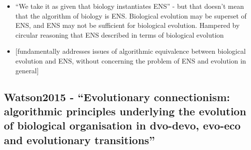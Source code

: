 \begin{itemize}
	\item
	
	``We take it as given that biology instantiates ENS'' - but that
	doesn't mean that the algorithm of biology is ENS. Biological
	evolution may be superset of ENS, and ENS may not be sufficient for
	biological evolution. Hampered by circular reasoning that ENS
	described in terms of biological evolution
	
	\item
	
	{[}fundamentally addresses issues of algorithmic equivalence between
	biological evolution and ENS, without concerning the problem of ENS
	and evolution in general{]}
	
\end{itemize}


\hypertarget{watson2015---evolutionary-connectionism-algorithmic-principles-underlying-the-evolution-of-biological-organisation-in-dvo-devo-evo-eco-and-evolutionary-transitions}{\subsection{Watson2015
		- ``Evolutionary connectionism: algorithmic principles underlying the
		evolution of biological organisation in dvo-devo, evo-eco and
		evolutionary
		transitions''}\label{watson2015---evolutionary-connectionism-algorithmic-principles-underlying-the-evolution-of-biological-organisation-in-dvo-devo-evo-eco-and-evolutionary-transitions}}

